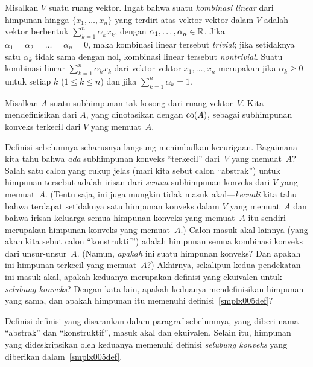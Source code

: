 \begin{defn} Misalkan $V$ suatu ruang vektor. Ingat bahwa suatu \emph{kombinasi linear}
dari himpunan hingga $\{x_1, \dots, x_n\}$ yang terdiri atas vektor-vektor dalam $V$ adalah
vektor berbentuk $\sum_{k=1}^n \alpha_k x_k$, dengan
$\alpha_1, \dots, \alpha_n \in \mathbb{R}$. Jika
$\alpha_1 = \alpha_2 = \dots = \alpha_n = 0$, maka kombinasi linear tersebut
\emph{trivial}; jika setidaknya satu $\alpha_k$ tidak sama dengan nol, kombinasi linear
tersebut \emph{nontrivial}. Suatu kombinasi linear
$\sum_{k=1}^n\alpha_k x_k$ dari vektor-vektor $x_1, \dots, x_n$ merupakan
 jika $\alpha_k \ge 0$ untuk setiap $k$ ($1 \le k \le n$) dan jika
$\sum_{k=1}^n \alpha_k = 1$.
\end{defn}

\begin{defn}\label{smplx005def} Misalkan $A$ suatu subhimpunan tak kosong dari ruang
vektor~$V$. Kita mendefinisikan
 dari $A$, yang dinotasikan dengan $\operatorname{co}(A)$, sebagai subhimpunan
konveks terkecil dari $V$ yang memuat~$A$.
\end{defn}

Definisi sebelumnya seharusnya langsung menimbulkan kecurigaan. Bagaimana kita tahu bahwa
\emph{ada} subhimpunan konveks ``terkecil'' dari~$V$ yang memuat~$A$? Salah satu calon yang
cukup jelas (mari kita sebut calon ``abstrak'') untuk himpunan tersebut adalah irisan dari
\emph{semua} subhimpunan konveks dari $V$ yang memuat~$A$. (Tentu saja, ini juga mungkin tidak
masuk akal---\emph{kecuali} kita tahu bahwa terdapat setidaknya satu himpunan konveks dalam
$V$ yang memuat~$A$ dan bahwa irisan keluarga semua himpunan konveks yang memuat~$A$ itu
sendiri merupakan himpunan konveks yang memuat~$A$.) Calon masuk akal lainnya (yang akan
kita sebut calon ``konstruktif'') adalah himpunan semua kombinasi konveks dari
unsur-unsur~$A$. (Namun, \emph{apakah} ini suatu himpunan konveks? Dan apakah ini himpunan
terkecil yang memuat~$A$?) Akhirnya, sekalipun kedua pendekatan ini masuk akal, apakah
keduanya merupakan definisi yang ekuivalen untuk \emph{selubung konveks}? Dengan kata
lain, apakah keduanya mendefinisikan himpunan yang sama, dan apakah himpunan itu memenuhi
definisi~\ref{smplx005def}?

\begin{prop}\label{smplx006} Definisi-definisi yang disarankan dalam paragraf sebelumnya,
yang diberi nama ``abstrak'' dan ``konstruktif'', masuk akal dan ekuivalen. Selain itu,
himpunan yang dideskripsikan oleh keduanya memenuhi definisi \emph{selubung konveks} yang diberikan
dalam~\ref{smplx005def}.
\end{prop}

